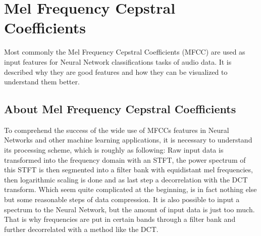 
\section{Mel Frequency Cepstral Coefficients}\label{sec:signal_mfcc}
Most commonly the Mel Frequency Cepstral Coefficients (MFCC) are used as input features for Neural Network classifications tasks of audio data.
It is described why they are good features and how they can be visualized to understand them better.

\subsection{About Mel Frequency Cepstral Coefficients}
To comprehend the success of the wide use of MFCCs features in Neural Networks and other machine learning applications, it is necessary to understand its processing scheme, which is roughly as following: 
Raw input data is transformed into the frequency domain with an STFT, the power spectrum of this STFT is then segmented into a filter bank with equidistant mel frequencies, then logarithmic scaling is done and as last step a decorrelation with the DCT transform.
Which seem quite complicated at the beginning, is in fact nothing else but some reasonable steps of data compression. 
It is also possible to input a spectrum to the Neural Network, but the amount of input data is just too much.
That is why frequencies are put in certain bands through a filter bank and further decorrelated with a method like the DCT.

